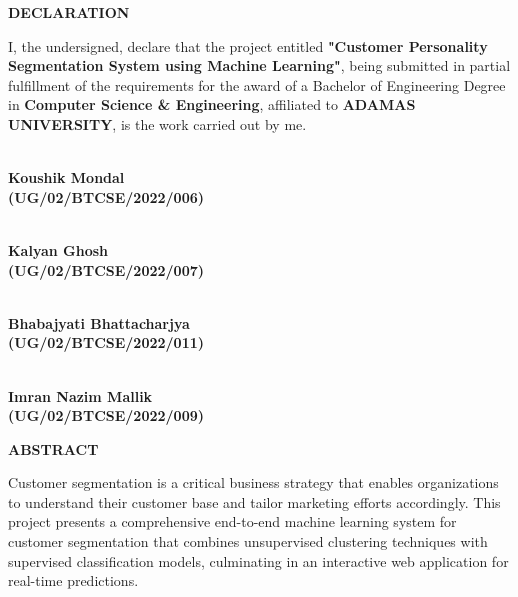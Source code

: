 \documentclass[12pt,a4paper]{report}
\begin{document}
\thispagestyle{plain}
\begin{center}
    \Large{\fontsize{14}{16}\selectfont\textbf{DECLARATION}}
\end{center}
\vspace{1.5cm}
\noindent I, the undersigned, declare that the project entitled \textbf{"Customer Personality Segmentation System using Machine Learning"}, being submitted in partial fulfillment of the requirements for the award of a Bachelor of Engineering Degree in \textbf{Computer Science \& Engineering}, affiliated to \textbf{ADAMAS UNIVERSITY}, is the work carried out by me.
\vspace{4cm}
\begin{center}
\underline{\hspace{5cm}}\\
\noindent \textbf{Koushik Mondal\\
(UG/02/BTCSE/2022/006)  }
 

\vspace{1cm}
\underline{\hspace{5cm}}\\
\noindent \textbf{Kalyan Ghosh\\
(UG/02/BTCSE/2022/007)  } 

\vspace{1cm}
\underline{\hspace{5cm}}\\
\noindent \textbf{Bhabajyati Bhattacharjya\\
(UG/02/BTCSE/2022/011)  } 

\vspace{1cm}
\underline{\hspace{5cm}}\\
\noindent \textbf{Imran Nazim Mallik\\
(UG/02/BTCSE/2022/009)  } 


\end{center}
\newpage

\thispagestyle{plain}
\begin{center}
    \fontsize{14}{16}\selectfont\textbf{ABSTRACT}
\end{center}
\vspace{1cm}
\justifying
\noindent
Customer segmentation is a critical business strategy that enables organizations to understand their customer base and tailor marketing efforts accordingly. This project presents a comprehensive end-to-end machine learning system for customer segmentation that combines unsupervised clustering techniques with supervised classification models, culminating in an interactive web application for real-time predictions.
\end{document}
